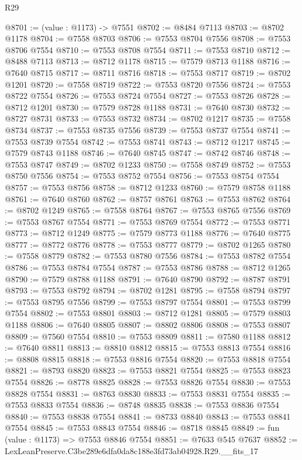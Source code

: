 \begin{lexlean}{R29}
\begin{coremodule}
@8701 := (value : @1173) -> @7551
@8702 := @8484 @7113
@8703 := @8702 @1178
@8704 := @7558 @8703
@8706 := @7553 @8704 @7556
@8708 := @7553 @8706 @7554
@8710 := @7553 @8708 @7554
@8711 := @7553 @8710
@8712 := @8488 @7113
@8713 := @8712 @1178
@8715 := @7579 @8713 @1188
@8716 := @7640 @8715
@8717 := @8711 @8716
@8718 := @7553 @8717
@8719 := @8702 @1201
@8720 := @7558 @8719
@8722 := @7553 @8720 @7556
@8724 := @7553 @8722 @7554
@8726 := @7553 @8724 @7554
@8727 := @7553 @8726
@8728 := @8712 @1201
@8730 := @7579 @8728 @1188
@8731 := @7640 @8730
@8732 := @8727 @8731
@8733 := @7553 @8732
@8734 := @8702 @1217
@8735 := @7558 @8734
@8737 := @7553 @8735 @7556
@8739 := @7553 @8737 @7554
@8741 := @7553 @8739 @7554
@8742 := @7553 @8741
@8743 := @8712 @1217
@8745 := @7579 @8743 @1188
@8746 := @7640 @8745
@8747 := @8742 @8746
@8748 := @7553 @8747
@8749 := @8702 @1233
@8750 := @7558 @8749
@8752 := @7553 @8750 @7556
@8754 := @7553 @8752 @7554
@8756 := @7553 @8754 @7554
@8757 := @7553 @8756
@8758 := @8712 @1233
@8760 := @7579 @8758 @1188
@8761 := @7640 @8760
@8762 := @8757 @8761
@8763 := @7553 @8762
@8764 := @8702 @1249
@8765 := @7558 @8764
@8767 := @7553 @8765 @7556
@8769 := @7553 @8767 @7554
@8771 := @7553 @8769 @7554
@8772 := @7553 @8771
@8773 := @8712 @1249
@8775 := @7579 @8773 @1188
@8776 := @7640 @8775
@8777 := @8772 @8776
@8778 := @7553 @8777
@8779 := @8702 @1265
@8780 := @7558 @8779
@8782 := @7553 @8780 @7556
@8784 := @7553 @8782 @7554
@8786 := @7553 @8784 @7554
@8787 := @7553 @8786
@8788 := @8712 @1265
@8790 := @7579 @8788 @1188
@8791 := @7640 @8790
@8792 := @8787 @8791
@8793 := @7553 @8792
@8794 := @8702 @1281
@8795 := @7558 @8794
@8797 := @7553 @8795 @7556
@8799 := @7553 @8797 @7554
@8801 := @7553 @8799 @7554
@8802 := @7553 @8801
@8803 := @8712 @1281
@8805 := @7579 @8803 @1188
@8806 := @7640 @8805
@8807 := @8802 @8806
@8808 := @7553 @8807
@8809 := @7560 @7554
@8810 := @7553 @8809
@8811 := @7580 @1188
@8812 := @7640 @8811
@8813 := @8810 @8812
@8815 := @7553 @8813 @7554
@8816 := @8808 @8815
@8818 := @7553 @8816 @7554
@8820 := @7553 @8818 @7554
@8821 := @8793 @8820
@8823 := @7553 @8821 @7554
@8825 := @7553 @8823 @7554
@8826 := @8778 @8825
@8828 := @7553 @8826 @7554
@8830 := @7553 @8828 @7554
@8831 := @8763 @8830
@8833 := @7553 @8831 @7554
@8835 := @7553 @8833 @7554
@8836 := @8748 @8835
@8838 := @7553 @8836 @7554
@8840 := @7553 @8838 @7554
@8841 := @8733 @8840
@8843 := @7553 @8841 @7554
@8845 := @7553 @8843 @7554
@8846 := @8718 @8845
@8849 := fun (value : @1173) => @7553 @8846 @7554
@8851 := @7633 @545 @7637
@8852 := LexLeanPreserve.C3be289e6dfa0da8c188e3fd73ab04928.R29.__fits_17

\end{coremodule}
\end{lexlean}
